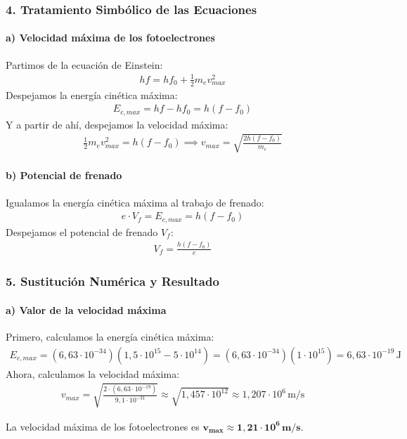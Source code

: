 \subsubsection*{4. Tratamiento Simbólico de las Ecuaciones}
\paragraph*{a) Velocidad máxima de los fotoelectrones}
Partimos de la ecuación de Einstein:
\begin{gather}
    hf = hf_0 + \frac{1}{2} m_e v_{max}^2
\end{gather}
Despejamos la energía cinética máxima:
\begin{gather}
    E_{c,max} = hf - hf_0 = h(f - f_0)
\end{gather}
Y a partir de ahí, despejamos la velocidad máxima:
\begin{gather}
    \frac{1}{2} m_e v_{max}^2 = h(f - f_0) \implies v_{max} = \sqrt{\frac{2h(f - f_0)}{m_e}}
\end{gather}
\paragraph*{b) Potencial de frenado}
Igualamos la energía cinética máxima al trabajo de frenado:
\begin{gather}
    e \cdot V_f = E_{c,max} = h(f - f_0)
\end{gather}
Despejamos el potencial de frenado $V_f$:
\begin{gather}
    V_f = \frac{h(f - f_0)}{e}
\end{gather}

\subsubsection*{5. Sustitución Numérica y Resultado}
\paragraph*{a) Valor de la velocidad máxima}
Primero, calculamos la energía cinética máxima:
\begin{gather}
    E_{c,max} = (6,63 \cdot 10^{-34}) (1,5 \cdot 10^{15} - 5 \cdot 10^{14}) = (6,63 \cdot 10^{-34})(1 \cdot 10^{15}) = 6,63 \cdot 10^{-19} \, \text{J}
\end{gather}
Ahora, calculamos la velocidad máxima:
\begin{gather}
    v_{max} = \sqrt{\frac{2 \cdot (6,63 \cdot 10^{-19})}{9,1 \cdot 10^{-31}}} \approx \sqrt{1,457 \cdot 10^{12}} \approx 1,207 \cdot 10^6 \, \text{m/s}
\end{gather}
\begin{cajaresultado}
    La velocidad máxima de los fotoelectrones es $\boldsymbol{v_{max} \approx 1,21 \cdot 10^6 \, \textbf{m/s}}$.
\end{cajaresultado}

